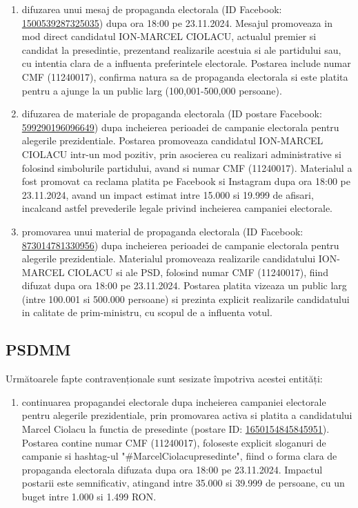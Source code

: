 \documentclass[a4paper,12pt]{article}
\begin{document}
\begin{enumerate}[leftmargin=*, label=\arabic*.)]
    \item difuzarea unui mesaj de propaganda electorala (ID Facebook: \href{https://www.facebook.com/ads/library/?id=1500539287325035}{1500539287325035}) dupa ora 18:00 pe 23.11.2024. Mesajul promoveaza in mod direct candidatul ION-MARCEL CIOLACU, actualul premier si candidat la presedintie, prezentand realizarile acestuia si ale partidului sau, cu intentia clara de a influenta preferintele electorale. Postarea include numar CMF (11240017), confirma natura sa de propaganda electorala si este platita pentru a ajunge la un public larg (100,001-500,000 persoane).
    \item difuzarea de materiale de propaganda electorala (ID postare Facebook: \href{https://www.facebook.com/ads/library/?id=599290196096649}{599290196096649}) dupa incheierea perioadei de campanie electorala pentru alegerile prezidentiale. Postarea promoveaza candidatul ION-MARCEL CIOLACU intr-un mod pozitiv, prin asocierea cu realizari administrative si folosind simbolurile partidului, avand si numar CMF (11240017). Materialul a fost promovat ca reclama platita pe Facebook si Instagram dupa ora 18:00 pe 23.11.2024, avand un impact estimat intre 15.000 si 19.999 de afisari, incalcand astfel prevederile legale privind incheierea campaniei electorale.
    \item promovarea unui material de propaganda electorala (ID Facebook: \href{https://www.facebook.com/ads/library/?id=873014781330956}{873014781330956}) dupa incheierea perioadei de campanie electorala pentru alegerile prezidentiale. Materialul promoveaza realizarile candidatului ION-MARCEL CIOLACU si ale PSD, folosind numar CMF (11240017), fiind difuzat dupa ora 18:00 pe 23.11.2024. Postarea platita vizeaza un public larg (intre 100.001 si 500.000 persoane) si prezinta explicit realizarile candidatului in calitate de prim-ministru, cu scopul de a influenta votul.
\end{enumerate}

\vspace{0.5cm}

\subsection{PSDMM}
Următoarele fapte contravenționale sunt sesizate împotriva acestei entități:

\begin{enumerate}[leftmargin=*, label=\arabic*.)]
    \item continuarea propagandei electorale dupa incheierea campaniei electorale pentru alegerile prezidentiale, prin promovarea activa si platita a candidatului Marcel Ciolacu la functia de presedinte (postare ID: \href{https://www.facebook.com/ads/library/?id=1650154845845951}{1650154845845951}). Postarea contine numar CMF (11240017), foloseste explicit sloganuri de campanie si hashtag-ul "\#MarcelCiolacupresedinte", fiind o forma clara de propaganda electorala difuzata dupa ora 18:00 pe 23.11.2024. Impactul postarii este semnificativ, atingand intre 35.000 si 39.999 de persoane, cu un buget intre 1.000 si 1.499 RON.
\end{enumerate}
\end{document}
